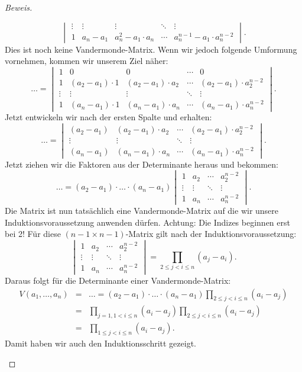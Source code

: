\documentclass[12pt, a4paper, oneside, titlepage]{report}
\newenvironment{bew}{\begin{proof}[Beweis]}{\end{proof}}
\theoremstyle{definition}
\begin{document}
\begin{bew}
\begin{itemize}
{$$\begin{vmatrix}
				\vdots & \vdots & \vdots & \ddots & \vdots \\     
				1 & a_n - a_1 & a_n^2 - a_1 \cdot a_n & \cdots & a_n^{n-1} - a_1 \cdot a_n^{n-2}
				\end{vmatrix}.$$
				Dies ist noch keine Vandermonde-Matrix. Wenn wir jedoch folgende Umformung vornehmen, kommen wir unserem Ziel näher:
				$$ \ldots = 
				\begin{vmatrix}
				1 & 0 & 0 & \cdots & 0 \\
				1 & (a_2 - a_1) \cdot 1 & (a_2 - a_1) \cdot a_2 & \cdots & (a_2 - a_1) \cdot a_2^{n-2} \\
				\vdots & \vdots & \vdots & \ddots & \vdots \\     
				1 & (a_n - a_1) \cdot 1 & (a_n - a_1) \cdot a_n & \cdots & (a_n - a_1) \cdot a_n^{n-2}
				\end{vmatrix}.$$
				Jetzt entwickeln wir nach der ersten Spalte und erhalten:
				$$ \ldots = \begin{vmatrix}
				(a_2 - a_1) & (a_2 - a_1) \cdot a_2 & \cdots & (a_2 - a_1) \cdot a_2^{n-2} \\
				\vdots & \vdots & \ddots & \vdots \\     
				(a_n - a_1) & (a_n - a_1) \cdot a_n & \cdots & (a_n - a_1) \cdot a_n^{n-2}
				\end{vmatrix}.$$
				Jetzt ziehen wir die Faktoren aus der Determinante heraus und bekommen:
				$$ \ldots = (a_2 - a_1) \cdot \ldots \cdot (a_n - a_1)
				\begin{vmatrix}
				1 & a_2 & \cdots & a_2^{n-2} \\
				\vdots & \vdots & \ddots & \vdots \\     
				1 & a_n & \cdots & a_n^{n-2}
				\end{vmatrix}.$$
				Die Matrix ist nun tatsächlich eine Vandermonde-Matrix auf die wir unsere Induktionsvoraussetzung anwenden dürfen. Achtung: Die Indizes beginnen erst bei 2! Für diese $ (n-1 \times n-1) $-Matrix gilt nach der Induktionsvoraussetzung:
				$$\begin{vmatrix}
				1 & a_2 & \cdots & a_2^{n-2} \\
				\vdots & \vdots & \ddots & \vdots \\     
				1 & a_n & \cdots & a_n^{n-2}
				\end{vmatrix}
				= \prod_{2 \leq j < i \leq n} (a_j-a_i).$$
				Daraus folgt für die Determinante einer Vandermonde-Matrix:
				\begin{eqnarray*}
				V(a_1, \dots, a_n) & = & \ldots = (a_2 - a_1) \cdot \ldots \cdot (a_n - a_1) \prod_{2 \leq j < i \leq n} (a_i - a_j)\\
				 & = & \prod_{j=1, 1 < i \leq n} (a_i - a_j) \prod_{2 \leq j < i \leq n} (a_i - a_j)\\
				 & = & \prod_{1 \leq j < i \leq n} (a_i - a_j).
				\end{eqnarray*}
			Damit haben wir auch den Induktionsschritt gezeigt.
			}
		\end{itemize}
	\end{bew}
	
\end{document}
